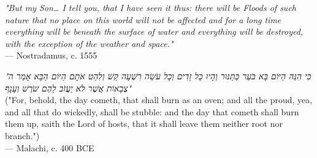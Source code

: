 \begin{flushright}
\emph{"But my Son… I tell you, that I have seen it thus: there will be Floods of such nature that no place on this world will not be affected and for a long time everything will be beneath the surface of water and everything will be destroyed, with the exception of the weather and space."}\\
— Nostradamus, c. 1555
\end{flushright}

\vspace{2em}

\begin{flushright}
\emph{"כִּי הִנֵּה הַיּוֹם בָּא בֹּעֵר כַּתַּנּוּר וְהָיוּ כָל זֵדִים וְכָל עֹשֵׂה רִשְׁעָה קַשׁ וְלִהַט אֹתָם הַיּוֹם הַבָּא אָמַר ה צְבָאוֹת אֲשֶׁר לֹא יַעֲזֹב לָהֶם שֹׁרֶשׁ וְעָנָף"} \\
("For, behold, the day cometh, that shall burn as an oven; and all the proud, yea, and all that do wickedly, shall be stubble: and the day that cometh shall burn them up, saith the Lord of hosts, that it shall leave them neither root nor branch.") \\
— Malachi, c. 400 BCE
\end{flushright}
